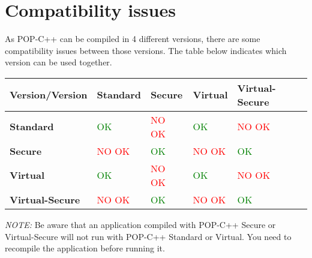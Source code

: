 \section{Compatibility issues}
\label{lb:compatibility}
As POP-C++ can be compiled in 4 different versions, there are some compatibility issues between those versions. The table below indicates which version can be used together.

\begin{center}
\begin{tabular}{|p{3cm}|p{3cm}|p{3cm}|p{3cm}|p{3cm}|}
\hline
\textbf{Version/Version} & \textbf{Standard}	& \textbf{Secure} & \textbf{Virtual} & \textbf{Virtual-Secure}\\ \hline
\textbf{Standard} & \textcolor{green}{OK} & \textcolor{red}{NO OK} & \textcolor{green}{OK} & \textcolor{red}{NO OK} \\ \hline
\textbf{Secure} & \textcolor{red}{NO OK} & \textcolor{green}{OK} & \textcolor{red}{NO OK} & \textcolor{green}{OK} \\ \hline
\textbf{Virtual} & \textcolor{green}{OK} & \textcolor{red}{NO OK} & \textcolor{green}{OK} & \textcolor{red}{NO OK} \\ \hline
\textbf{Virtual-Secure} & \textcolor{red}{NO OK} & \textcolor{green}{OK} & \textcolor{red}{NO OK} & \textcolor{green}{OK} \\ \hline
\end{tabular}
\end{center}\s

\textit{NOTE:} Be aware that an application compiled with POP-C++ Secure or Virtual-Secure will not run with POP-C++ Standard or Virtual. You need to recompile the application before running it.